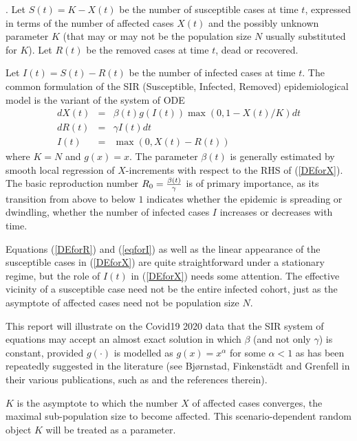 \documentclass{article}
\begin{document}
. Let $S(t) = K - X(t)$ be the number of susceptible cases at time $t$, expressed in terms of the number of affected cases $X(t)$ and the possibly unknown parameter $K$ (that may or may not be the population size $N$ usually substituted for $K$). Let $R(t)$ be the removed cases at time $t$, dead or recovered.

Let $I(t)=S(t)-R(t)$ be the number of infected cases at time $t$. The common formulation of the SIR (Susceptible, Infected, Removed) epidemiological model is the variant of the system of ODE
\begin{eqnarray}
dX(t) & = & \beta(t) g(I(t)) \max(0,1 - X(t)/K) dt \label{DEforX} \\
dR(t) & = & \gamma I(t) dt \label{DEforR} \\
I(t) & = & \max(0,X(t)-R(t)) \label{eqforI}
\end{eqnarray}
where $K=N$ and $g(x)=x$. The parameter $\beta(t)$ is generally estimated by smooth local regression of \linebreak $X$-increments with respect to the RHS of (\ref{DEforX}). The basic reproduction number $R_0={{\beta(t)} \over \gamma}$ is of primary importance, as its transition from above to below $1$ indicates whether the epidemic is spreading or dwindling, whether the number of infected cases $I$ increases or decreases with time.

\bigskip

Equations (\ref{DEforR}) and (\ref{eqforI}) as well as the linear appearance of the susceptible cases in (\ref{DEforX}) are quite straightforward under a stationary regime, but the role of $I(t)$ in (\ref{DEforX}) needs some attention. The effective vicinity of a susceptible case need not be the entire infected cohort, just as the asymptote of affected cases need not be population size $N$.

This report will illustrate on the Covid19 2020 data that
the SIR system of equations may accept an almost exact solution in which $\beta$ (and not only $\gamma$) is constant, provided $g(\cdot)$ is modelled as $g(x)=x^\alpha$
for some $\alpha<1$ as has been repeatedly suggested in the literature (see Bj{\o}rnstad, Finkenst\"{a}dt and Grenfell in their various publications, such as \cite{AAA} and the references therein).

$K$ is the asymptote to which the number $X$ of affected cases converges, the maximal sub-population size to become affected. This scenario-dependent random object $K$ will be treated as a parameter.
\end{document}
